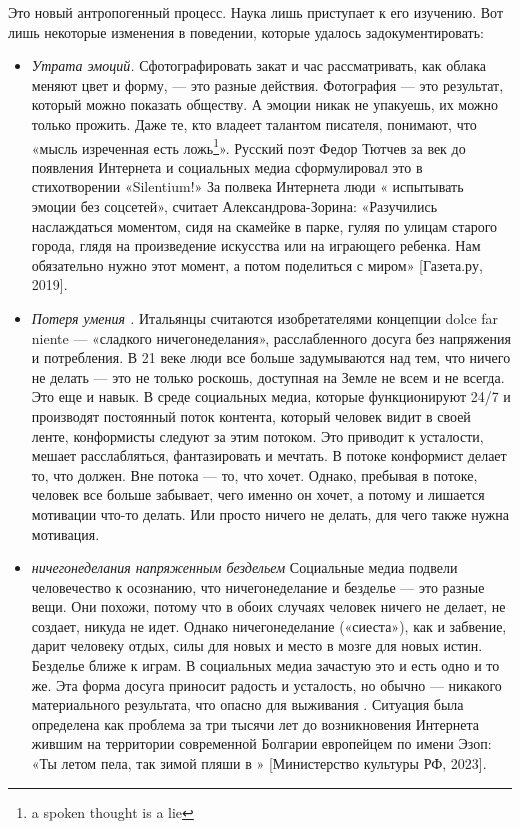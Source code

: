 Это новый антропогенный процесс. Наука лишь приступает к его изучению. Вот лишь некоторые изменения в поведении, которые удалось задокументировать:
\begin{itemize}[noitemsep, label=--]
    \item \textit{Утрата эмоций.} Сфотографировать закат и час рассматривать, как облака меняют цвет и форму, --- это разные действия. Фотография --- это результат, который можно показать обществу. А эмоции никак не упакуешь, их можно только прожить. Даже те, кто владеет талантом писателя, понимают, что «мысль изреченная есть ложь\footnote{a spoken thought is a lie}». Русский поэт Федор Тютчев за век до появления Интернета и социальных медиа сформулировал это в стихотворении «Silentium!» За полвека Интернета люди « испытывать эмоции без соцсетей», считает Александрова-Зорина: «Разучились наслаждаться моментом, сидя на скамейке в парке, гуляя по улицам старого города, глядя на произведение искусства или на играющего ребенка. Нам обязательно нужно  этот момент, а потом поделиться с миром» [Газета.ру, 2019].
    \item \textit{Потеря умения .} Итальянцы считаются изобретателями концепции dolce far niente --- «сладкого ничегонеделания», расслабленного досуга без напряжения и потребления. В 21 веке люди все больше задумываются над тем, что ничего не делать --- это не только роскошь, доступная на Земле не всем и не всегда. Это еще и навык. В среде социальных медиа, которые функционируют 24/7 и производят постоянный поток контента, который человек видит в своей ленте, конформисты следуют за этим потоком. Это приводит к усталости, мешает расслабляться, фантазировать и мечтать. В потоке конформист делает то, что должен. Вне потока --- то, что хочет. Однако, пребывая в потоке, человек все больше забывает, чего именно он хочет, а потому и лишается мотивации что-то делать. Или просто ничего не делать, для чего также нужна мотивация.
    \item \textit{ ничегонеделания напряженным бездельем} Социальные медиа подвели человечество к осознанию, что ничегонеделание и безделье --- это разные вещи. Они похожи, потому что в обоих случаях человек ничего не делает, не создает, никуда не идет. Однако ничегонеделание («сиеста»), как и забвение, дарит человеку отдых, силы для новых  и место в мозге для новых истин. Безделье ближе к играм. В социальных медиа зачастую это и есть одно и то же. Эта форма досуга приносит радость и усталость, но обычно --- никакого материального результата, что опасно для выживания . Ситуация была определена как проблема за три тысячи лет до возникновения Интернета жившим на территории современной Болгарии европейцем по имени Эзоп: «Ты летом пела, так зимой пляши в » [Министерство культуры РФ, 2023].

\end{itemize}

